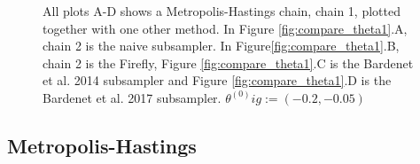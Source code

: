 \begin{figure}
    \caption{All plots A-D shows a Metropolis-Hastings chain, chain 1, plotted together with one other method. In Figure \ref{fig:compare_theta1}.A, chain 2 is the naive subsampler. In Figure\ref{fig:compare_theta1}.B, chain 2 is the Firefly, Figure \ref{fig:compare_theta1}.C is the Bardenet et al. 2014 subsampler and Figure \ref{fig:compare_theta1}.D is the Bardenet et al. 2017 subsampler. $\theta
   ^{\left(0\right)} ig:= \left(-0.2, -0.05\right)$}%
    \label{fig:compare_theta1_normal}%
\end{figure}


\subsection*{Metropolis-Hastings}\label{subsec:mh_sim}
